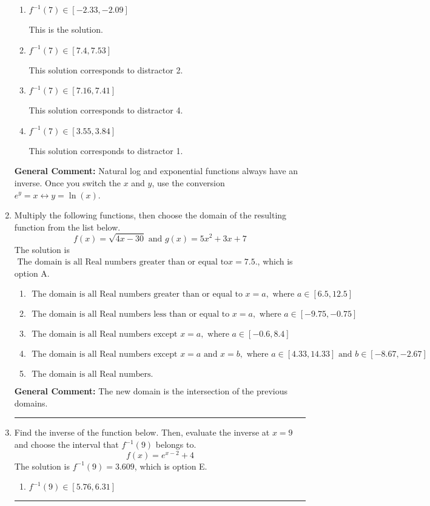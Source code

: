 \documentclass{extbook}[14pt]
\newcommand{\litem}[1]{\item #1

\rule{\textwidth}{0.4pt}}
\begin{document}
\begin{enumerate}
{\begin{enumerate}[label=\Alph*.]
 This solution corresponds to distractor 3.
\item \( f^{-1}(7) \in [-2.33, -2.09] \)

 This is the solution.
\item \( f^{-1}(7) \in [7.4, 7.53] \)

 This solution corresponds to distractor 2.
\item \( f^{-1}(7) \in [7.16, 7.41] \)

 This solution corresponds to distractor 4.
\item \( f^{-1}(7) \in [3.55, 3.84] \)

 This solution corresponds to distractor 1.
\end{enumerate}

\textbf{General Comment:} Natural log and exponential functions always have an inverse. Once you switch the $x$ and $y$, use the conversion $ e^y = x \leftrightarrow y=\ln(x)$.
}
\litem{
Multiply the following functions, then choose the domain of the resulting function from the list below.
\[ f(x) = \sqrt{4x-30}  \text{ and } g(x) = 5x^{2} +3 x + 7 \]The solution is \( \text{ The domain is all Real numbers greater than or equal to} x = 7.5. \), which is option A.\begin{enumerate}[label=\Alph*.]
\item \( \text{ The domain is all Real numbers greater than or equal to } x = a, \text{ where } a \in [6.5, 12.5] \)


\item \( \text{ The domain is all Real numbers less than or equal to } x = a, \text{ where } a \in [-9.75, -0.75] \)


\item \( \text{ The domain is all Real numbers except } x = a, \text{ where } a \in [-0.6, 8.4] \)


\item \( \text{ The domain is all Real numbers except } x = a \text{ and } x = b, \text{ where } a \in [4.33, 14.33] \text{ and } b \in [-8.67, -2.67] \)


\item \( \text{ The domain is all Real numbers. } \)


\end{enumerate}

\textbf{General Comment:} The new domain is the intersection of the previous domains.
}
\litem{
Find the inverse of the function below. Then, evaluate the inverse at $x = 9$ and choose the interval that $f^{-1}(9)$ belongs to.
\[ f(x) = e^{x-2}+4 \]The solution is \( f^{-1}(9) = 3.609 \), which is option E.\begin{enumerate}[label=\Alph*.]
\item \( f^{-1}(9) \in [5.76, 6.31] \)


\end{enumerate}}
\end{enumerate}
\end{document}

